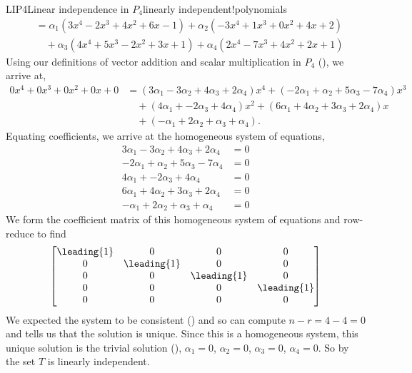 \begin{example}{LIP4}{Linear independence in $P_4$}{linearly independent!polynomials}
\begin{align*}
%
&=\alpha_1\left(3x^4-2x^3+4x^2+6x-1\right)+\alpha_2\left(-3x^4+1x^3+0x^2+4x+2\right)\\
&\quad +\alpha_3\left(4x^4+5x^3-2x^2+3x+1\right)+\alpha_4\left(2x^4-7x^3+4x^2+2x+1\right)
\end{align*}
%
Using our definitions of vector addition and scalar multiplication in $P_4$ (), we arrive at,
%
\begin{align*}
0x^4+0x^3+0x^2+0x+0&=
\left(3\alpha_1-3\alpha_2+4\alpha_3+2\alpha_4\right)x^4+
\left(-2\alpha_1+\alpha_2+5\alpha_3-7\alpha_4\right)x^3\\
&\quad +
\left(4\alpha_1+              -2\alpha_3+4\alpha_4\right)x^2+
\left(6\alpha_1+4\alpha_2+3\alpha_3+2\alpha_4\right)x\\
&\quad +
\left(-\alpha_1+2\alpha_2+\alpha_3+\alpha_4\right).
\end{align*}
%
Equating coefficients, we arrive at the homogeneous system of equations,
%
\begin{align*}
3\alpha_1-3\alpha_2+4\alpha_3+2\alpha_4&=0\\
-2\alpha_1+\alpha_2+5\alpha_3-7\alpha_4&=0\\
4\alpha_1+              -2\alpha_3+4\alpha_4&=0\\
6\alpha_1+4\alpha_2+3\alpha_3+2\alpha_4&=0\\
-\alpha_1+2\alpha_2+\alpha_3+\alpha_4&=0
\end{align*}
%
We form the coefficient matrix of this homogeneous system of equations and row-reduce to find
%
\begin{equation*}
\begin{bmatrix}
\leading{1} & 0 & 0 & 0\\
0 & \leading{1} & 0 & 0\\
0 & 0 & \leading{1} & 0\\
0 & 0 & 0 & \leading{1}\\
0 & 0 & 0 & 0
\end{bmatrix}
\end{equation*}
%
We expected the system to be consistent () and so can compute $n-r=4-4=0$ and  tells us that the solution is unique.  Since this is a homogeneous system, this unique solution is the trivial solution (),  $\alpha_1=0$, $\alpha_2=0$, $\alpha_3=0$, $\alpha_4=0$.  So by  the set $T$ is linearly independent.\par
%

\end{example}
